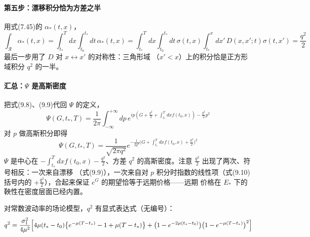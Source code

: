 \paragraph{第五步：漂移积分恰为方差之半}
用式(7.45)的 $\alpha_{*}(t,x)$，
\begin{equation*}
\int_{\mathcal{R}}\alpha_{*}(t,x)
=\int_{t_*}^{T}dx\int_{t_0}^{t_*}dt\,\alpha_{*}(t,x)
=\int_{t_*}^{T}dx\int_{t_0}^{t_*}dt\,\sigma(t,x)\int_{t_*}^{x}dx'\,
D(x,x';t)\sigma(t,x')=\frac{q^{2}}{2}\tag{9.9}
\end{equation*}
最后一步用了 $D$ 对 $x\leftrightarrow x'$ 的对称性：三角形域
（$x'<x$）上的积分恰是正方形域积分 $q^{2}$ 的一半。

\paragraph{汇总：$\Psi$ 是高斯密度}
把式(9.8)、(9.9)代回 $\Psi$ 的定义，
\begin{equation*}
\Psi(G,t_*,T)=\frac{1}{2\pi}\int_{-\infty}^{+\infty}dp\,
e^{ip(G+\frac{q^{2}}{2}+\int_{t_*}^{T}dxf(t_0,x))-\frac{q^{2}}{2}p^{2}}
\end{equation*}
对 $p$ 做高斯积分即得
\begin{equation*}
\Psi(G,t_*,T)=\frac{1}{\sqrt{2\pi q^{2}}}
e^{-\frac{1}{2q^{2}}\bigl(G+\int_{t_*}^{T}dxf(t_0,x)+\frac{q^{2}}{2}
\bigr)^{2}}\tag{9.10}
\end{equation*}
$\Psi$ 是中心在 $-\int_{t_*}^{T}dxf(t_0,x)-\frac{q^{2}}{2}$、方差 $q^{2}$
的高斯密度。注意 $\frac{q^{2}}{2}$ 出现了两次、符号相反：一次来自漂移
（式(9.9)），一次来自对 $p$ 积分时指数的线性项（式(9.10)括号内的
$+\frac{q^{2}}{2}$），合起来保证 $e^{G}$ 的期望恰等于远期价格——远期
价格在 $E_{*}$ 下的鞅性在密度层面已经内置。

对常数波动率的场论模型，$q^{2}$ 有显式表达式（无编号）：
\begin{equation*}
q^{2}=\frac{\sigma_1^{2}}{4\mu^{2}}\Bigl[4\mu(t_*-t_0)
\bigl\{e^{-\mu(T-t_*)}-1+\mu(T-t_*)\bigr\}
+\bigl(1-e^{-2\mu(t_*-t_0)}\bigr)\bigl(1-e^{-\mu(T-t_*)}\bigr)^{2}\Bigr]
\end{equation*}

